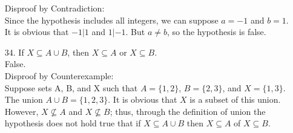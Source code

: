 \documentclass[10pt] {report}
\begin{document}
\begin{enumerate}
Disproof by Contradiction:\\
Since the hypothesis includes all integers, we can suppose $a=-1$ and $b=1$. It is obvious that $-1|1$ and $1|-1$. But $a \neq b$, so the hypothesis is false. 
\item[34.] If $X\subseteq A\cup B$, then $X\subseteq A$ or $X\subseteq B$.\\
False.\\
Disproof by Counterexample:\\
Suppose sets A, B, and X such that $A=\{1,2\}$, $B=\{2,3\}$, and $X=\{1,3\}$. The union $A\cup B=\{1,2,3\}$. It is obvious that $X$ is a subset of this union. However, $X\nsubseteq A$ and $X\nsubseteq B$; thus, through the definition of union the hypothesis does not hold true that if $X\subseteq A \cup B$ then $X\subseteq A$ of $X\subseteq B$.
\end{enumerate}
\end{document}
